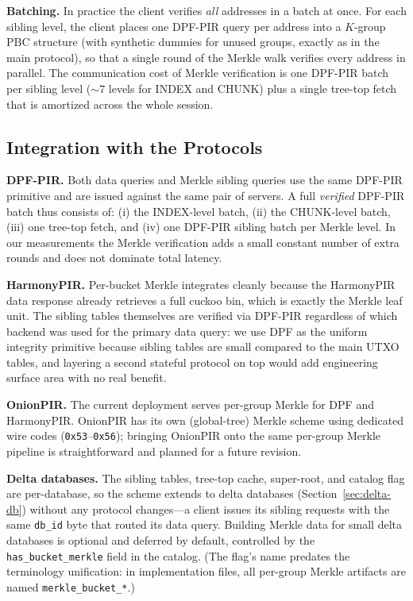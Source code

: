 \textbf{Batching.} In practice the client verifies \emph{all} addresses in a batch at once. For each sibling level, the client places one DPF-PIR query per address into a $K$-group PBC structure (with synthetic dummies for unused groups, exactly as in the main protocol), so that a single round of the Merkle walk verifies every address in parallel. The communication cost of Merkle verification is one DPF-PIR batch per sibling level ($\sim\!7$ levels for INDEX and CHUNK) plus a single tree-top fetch that is amortized across the whole session.

\subsection{Integration with the Protocols}

\textbf{DPF-PIR.} Both data queries and Merkle sibling queries use the same DPF-PIR primitive and are issued against the same pair of servers. A full \emph{verified} DPF-PIR batch thus consists of: (i) the INDEX-level batch, (ii) the CHUNK-level batch, (iii) one tree-top fetch, and (iv) one DPF-PIR sibling batch per Merkle level. In our measurements the Merkle verification adds a small constant number of extra rounds and does not dominate total latency.

\textbf{HarmonyPIR.} Per-bucket Merkle integrates cleanly because the HarmonyPIR data response already retrieves a full cuckoo bin, which is exactly the Merkle leaf unit. The sibling tables themselves are verified via DPF-PIR regardless of which backend was used for the primary data query: we use DPF as the uniform integrity primitive because sibling tables are small compared to the main UTXO tables, and layering a second stateful protocol on top would add engineering surface area with no real benefit.

\textbf{OnionPIR.} The current deployment serves per-group Merkle for DPF and HarmonyPIR. OnionPIR has its own (global-tree) Merkle scheme using dedicated wire codes (\texttt{0x53}--\texttt{0x56}); bringing OnionPIR onto the same per-group Merkle pipeline is straightforward and planned for a future revision.

\textbf{Delta databases.} The sibling tables, tree-top cache, super-root, and catalog flag are per-database, so the scheme extends to delta databases (Section~\ref{sec:delta-db}) without any protocol changes---a client issues its sibling requests with the same \texttt{db\_id} byte that routed its data query. Building Merkle data for small delta databases is optional and deferred by default, controlled by the \texttt{has\_bucket\_merkle} field in the catalog. (The flag's name predates the terminology unification: in implementation files, all per-group Merkle artifacts are named \texttt{merkle\_bucket\_*}.)

